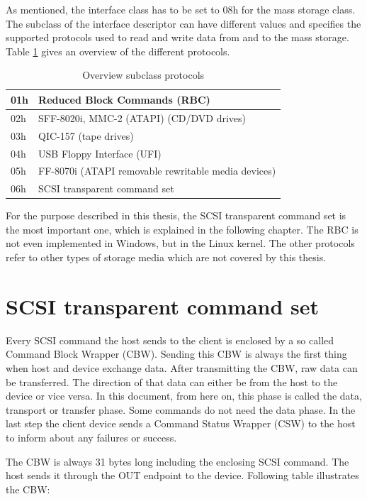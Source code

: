 As mentioned, the interface class has to be set to 08h for the mass storage class. The subclass of the interface descriptor can have different values and specifies the supported protocols used to read and write data from and to the mass storage. Table \ref{table:subclass} gives an overview of the different protocols.

\begin{table}[ht]
\caption{Overview subclass protocols \cite{usb_ms_jan}}
\centering
\begin{tabular}{|l|l|}
\hline\hline
01h & Reduced Block Commands (RBC) \\ \hline
02h & SFF-8020i, MMC-2 (ATAPI) (CD/DVD drives) \\ \hline
03h & QIC-157 (tape drives) \\ \hline
04h & USB Floppy Interface (UFI) \\ \hline
05h & FF-8070i (ATAPI removable rewritable media devices) \\ \hline
06h & SCSI transparent command set \\ \hline
\end{tabular}
\label{table:subclass}
\end{table}

For the purpose described in this thesis, the SCSI transparent command set is the most important one, which is explained in the following chapter. The RBC is not even implemented in Windows, but in the Linux kernel\cite{usb_ms_jan}. The other protocols refer to other types of storage media which are not covered by this thesis.

\section{SCSI transparent command set}

Every SCSI command the host sends to the client is enclosed by a so called Command Block Wrapper (CBW). Sending this CBW is always the first thing when host and device exchange data. After transmitting the CBW, raw data can be transferred. The direction of that data can either be from the host to the device or vice versa. In this document, from here on, this phase is called the data, transport or transfer phase. Some commands do not need the data phase. In the last step the client device sends a Command Status Wrapper (CSW) to the host to inform about any failures or success.

The CBW is always 31 bytes long including the enclosing SCSI command. The host sends it through the OUT endpoint to the device. Following table illustrates the CBW:

